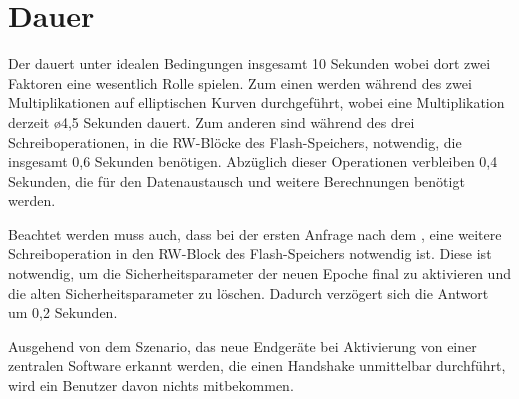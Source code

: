 \section{Dauer}

Der  dauert unter idealen Bedingungen insgesamt 10 Sekunden wobei dort zwei Faktoren eine wesentlich Rolle spielen.
Zum einen werden während des  zwei Multiplikationen auf elliptischen Kurven durchgeführt, wobei eine Multiplikation derzeit \o 4,5 Sekunden dauert.
Zum anderen sind während des  drei Schreiboperationen, in die RW-Blöcke des Flash-Speichers, notwendig, die insgesamt 0,6 Sekunden benötigen.
Abzüglich dieser Operationen verbleiben 0,4 Sekunden, die für den Datenaustausch und weitere Berechnungen benötigt werden.

Beachtet werden muss auch, dass bei der ersten Anfrage nach dem , eine weitere Schreiboperation in den RW-Block des Flash-Speichers notwendig ist.
Diese ist notwendig, um die Sicherheitsparameter der neuen Epoche final zu aktivieren und die alten Sicherheitsparameter zu löschen. Dadurch verzögert sich
die Antwort um 0,2 Sekunden.

Ausgehend von dem Szenario, das neue Endgeräte bei Aktivierung von einer zentralen Software erkannt werden, die einen Handshake unmittelbar durchführt,
wird ein Benutzer davon nichts mitbekommen.